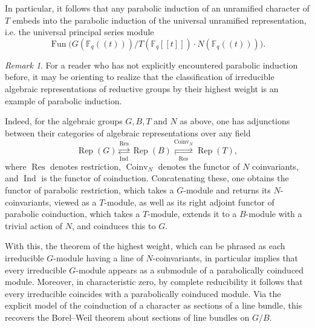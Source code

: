 \documentclass[10pt]{amsart}
\newcommand{\Fqt}{\Fq(\!(t)\!)}
\newcommand{\on}{\operatorname}
\newcommand{\Fq}{\mathbb{F}_q}
\newcommand{\Fun}{\on{Fun}}
\theoremstyle{remark}
\newtheorem{re}[subsubsection]{Remark}
\numberwithin{equation}{section}
\begin{document}
	In particular, it follows that any parabolic induction of an 
	unramified character of $T$ embeds into the parabolic induction of the 
	universal unramified representation, i.e. the universal principal series module
	\[
	    \Fun\big( G(\Fqt) / T(\Fq[[t]]) \cdot N(\Fqt)\big).
	\]

	\begin{re} For a reader who has not explicitly encountered parabolic 
	induction before, it may be orienting to realize that the classification of 
	irreducible algebraic representations of reductive groups by their highest 
	weight is an example of parabolic induction. 
	
	Indeed, for the algebraic 
	groups $G,B,T$ and $N$ as above, one has adjunctions between their 
	categories of algebraic representations over any field
	\[
	    \on{Rep}(G) \overset{\on{Res}}{\underset{\on{Ind}}{\rightleftarrows}} 
	    \on{Rep}(B) 
	    \overset{\on{Coinv}_N}{\underset{\on{Res}}{\rightleftarrows}} 
	    \on{Rep}(T),
	\]
	where $\on{Res}$ denotes restriction, $\on{Coinv}_N$ denotes the functor of 
	$N$ coinvariants, and $\on{Ind}$ is the functor of coinduction.  
	Concatenating these, one obtains the functor of parabolic restriction, 
	which takes a $G$-module and returns its $N$-coinvariants, viewed as a 
	$T$-module, as well as its right adjoint functor of parabolic coinduction, 
	which takes a $T$-module, extends it to a $B$-module with a trivial 
	action of $N$, and coinduces this to $G$.
	
	 With this, the theorem of 
	the highest weight, which can be phrased as each irreducible $G$-module 
	having a line of $N$-coinvariants, in particular implies that every 
	irreducible $G$-module appears as a submodule of a parabolically coinduced 
	module. Moreover, in characteristic zero, by complete reducibility it 
	follows that every irreducible coincides with a parabolically coinduced module. Via the 
	explicit model of the coinduction of a character as sections of a line bundle, this recovers  
	the 
	Borel--Weil theorem about sections of line bundles on $G/B$.  \end{re}
	
\end{document}
